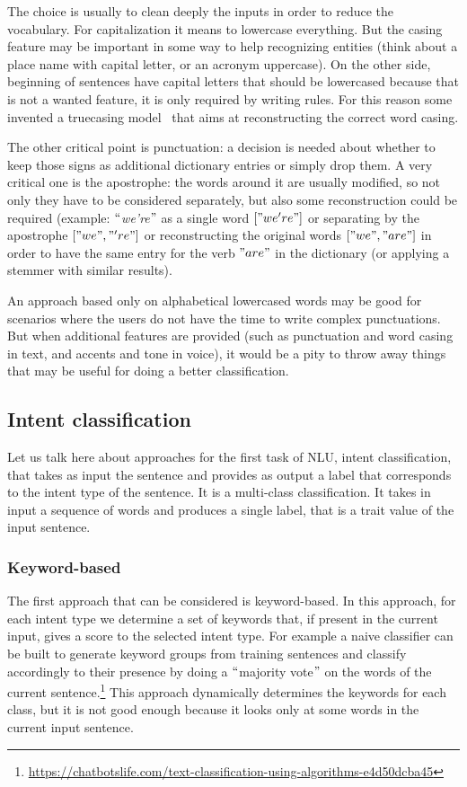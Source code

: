 The choice is usually to clean deeply the inputs in order to reduce the vocabulary. For capitalization it means to lowercase everything. But the casing feature may be important in some way to help recognizing entities (think about a place name with capital letter, or an acronym uppercase). On the other side, beginning of sentences have capital letters that should be lowercased because that is not a wanted feature, it is only required by writing rules. For this reason some invented a truecasing model~\cite{lita2003truecasing} that aims at reconstructing the correct word casing.

The other critical point is punctuation: a decision is needed about whether to keep those signs as additional dictionary entries or simply drop them. A very critical one is the apostrophe: the words around it are usually modified, so not only they have to be considered separately, but also some reconstruction could be required (example: $``$\textit{we're}$"$  as a single word  \(  \left[ "we're" \right]  \)  or separating by the apostrophe  \(  \left[ "we", "'re" \right]  \)  or reconstructing the original words  \(  \left[ "we", "are" \right]  \)  in order to have the same entry for the verb  \( "are" \)  in the dictionary (or applying a stemmer with similar results).

An approach based only on alphabetical lowercased words may be good for scenarios where the users do not have the time to write complex punctuations. But when additional features are provided (such as punctuation and word casing in text, and accents and tone in voice), it would be a pity to throw away things that may be useful for doing a better classification.

\subsection{Intent classification}
\label{soaIntent}

Let us talk here about approaches for the first task of NLU, intent classification, that takes as input the sentence and provides as output a label that corresponds to the intent type of the sentence. It is a multi-class classification. It takes in input a sequence of words and produces a single label, that is a trait value of the input sentence.

\subsubsection{Keyword-based}
The first approach that can be considered is keyword-based. In this approach, for each intent type we determine a set of keywords that, if present in the current input, gives a score to the selected intent type. For example a naive classifier can be built to generate keyword groups from training sentences and classify accordingly to their presence by doing a $``$majority vote$"$  on the words of the current sentence.\footnote{\url{https://chatbotslife.com/text-classification-using-algorithms-e4d50dcba45}} This approach dynamically determines the keywords for each class, but it is not good enough because it looks only at some words in the current input sentence.


